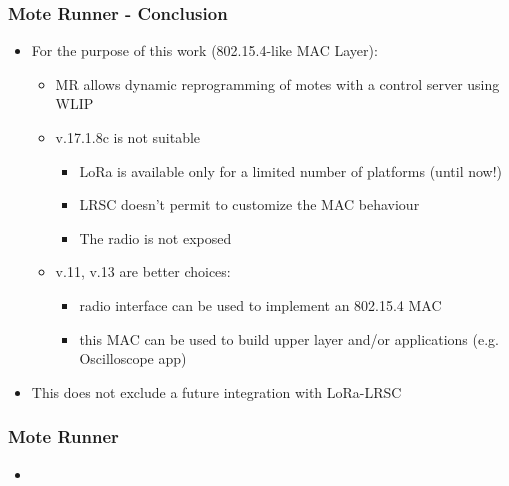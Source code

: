 \begin{frame}[fragile]
  \frametitle{Mote Runner - Conclusion}
  \vspace{-1em}
  \begin{itemize}
    \item For the purpose of this work (802.15.4-like MAC Layer):
    \begin{itemize}
    	\item MR allows dynamic reprogramming of motes with a control server using WLIP
    	\item v.17.1.8c is not suitable
    	\begin{itemize}
	  \item LoRa is available only for a limited number of platforms (until now!)
	  \item LRSC doesn’t permit to customize the MAC behaviour
	  \item The radio is not exposed
    	\end{itemize}
    	\item v.11, v.13 are better choices:
    	\begin{itemize}
	  \item radio interface can be used to implement an 802.15.4 MAC
	  \item this MAC can be used to build upper layer and/or applications (e.g. Oscilloscope app)
    	\end{itemize}
    \end{itemize}
    \item This does not exclude a future integration with LoRa-LRSC
  \end{itemize}
\end{frame}

\begin{frame}[fragile]
  \frametitle{Mote Runner}
  \begin{itemize}
  	\item 
  \end{itemize}
\end{frame}